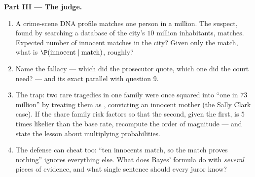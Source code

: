 \begin{problem}
\medskip
\noindent\textbf{Part III --- The judge.}
\begin{enumerate}[resume]
  \item A crime-scene DNA profile matches one person in a
        million. The suspect, found by searching a database of
        the city's $10$ million inhabitants, matches. Expected
        number of innocent matches in the city? Given only the
        match, what is $\P(\text{innocent} \mid
        \text{match})$, roughly?
  \item Name the fallacy --- which  did the
        prosecutor quote, which one did the court need? ---
        and its exact parallel with question 9.
  \item The  trap: two rare tragedies in one family
        were once squared into ``one in $73$ million'' by
        treating them as , convicting an innocent
        mother (the Sally Clark case). If the  share
        family risk factors so that the second, given the
        first, is $5$ times likelier than the base rate,
        recompute the order of magnitude --- and state the
        lesson about multiplying probabilities.
  \item The defense can cheat too: ``ten innocents match, so
        the match proves nothing'' ignores everything else.
        What does Bayes' formula do with \emph{several} pieces
        of evidence, and what single sentence should every
        juror know?
\end{enumerate}


\end{problem}

